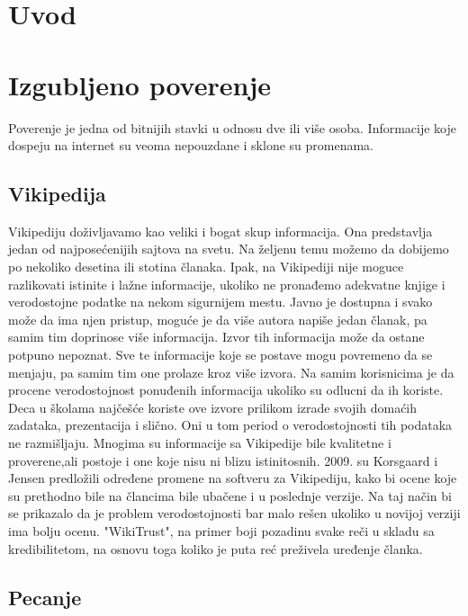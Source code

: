 \documentclass[a4paper]{article}
\begin{document}
\tableofcontents

\newpage

\section{Uvod}
\label{sec:uvod}

\section{Izgubljeno poverenje}

Poverenje je jedna od  bitnijih stavki u odnosu dve ili više osoba. Informacije koje dospeju na internet su veoma nepouzdane i sklone su promenama.

\subsection{Vikipedija}
\label{subsec:podnaslovIP1}

Vikipediju doživljavamo kao veliki i bogat skup informacija. Ona predstavlja jedan od najposećenijih sajtova na svetu. Na željenu temu možemo da dobijemo po nekoliko desetina ili stotina članaka. Ipak, na Vikipediji nije moguce razlikovati istinite i lažne informacije, ukoliko ne pronađemo adekvatne knjige i verodostojne podatke na nekom sigurnijem mestu. Javno je dostupna i svako može da ima njen pristup, moguće je da više autora napiše jedan članak, pa samim tim doprinose više informacija. Izvor tih informacija može da ostane potpuno nepoznat. Sve te informacije koje se postave mogu povremeno da se menjaju, pa samim tim one prolaze kroz više izvora. Na samim korisnicima je da procene verodostojnost ponuđenih informacija ukoliko su odlucni da ih koriste.  Deca u školama najčešće koriste ove izvore prilikom izrade svojih domaćih zadataka, prezentacija i slično. Oni u tom period o verodostojnosti tih podataka ne razmišljaju. Mnogima su informacije sa Vikipedije bile kvalitetne i proverene,ali postoje i one koje nisu ni blizu istinitosnih.
2009.  su  Korsgaard i Jensen predložili  određene promene na softveru za Vikipediju, kako bi ocene koje su prethodno bile na člancima bile ubačene i u poslednje verzije. Na taj način bi se prikazalo da je problem verodostojnosti bar malo rešen ukoliko u novijoj verziji ima bolju ocenu. "WikiTrust", na primer boji pozadinu svake reči u skladu sa kredibilitetom, na osnovu toga koliko je puta reć preživela uređenje članka. \cite{tInOnl}

\subsection{Pecanje}
\label{subsec:podnaslovIP2}
\end{document}
